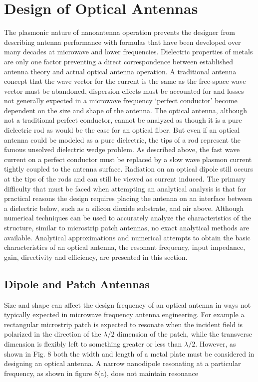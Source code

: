 \documentclass[11pt]{article}
\begin{document}
\section{Design of Optical Antennas}
%
The plasmonic nature of nanoantenna operation prevents the designer from describing antenna performance with formulas that have been developed over many decades at microwave and lower frequencies. Dielectric properties of metals are only one factor preventing a direct correspondence between established antenna theory and actual optical antenna operation. A traditional antenna concept that the wave vector for the current is the same as the free-space wave vector must be abandoned, dispersion effects must be accounted for and losses not generally expected in a microwave frequency  `perfect conductor' become dependent on the size and shape of the antenna.
The optical antenna, although not a traditional perfect conductor, cannot be analyzed as though it is a pure dielectric rod as would be the case for an optical fiber. But even if an optical antenna could be modeled as a pure dielectric, the tips of a rod represent the famous unsolved dielectric wedge problem. As described above, the fast wave current on a perfect conductor must be replaced by a slow wave plasmon current tightly coupled to the antenna surface. Radiation on an optical dipole still occurs at the tips of the rods and can still be viewed as current induced. The primary difficulty that must be faced when attempting an analytical analysis is that for practical reasons the design requires placing the antenna on an interface between a dielectric below, such as a silicon dioxide substrate, and air above. Although numerical techniques can be used to accurately analyze the characteristics of the structure, similar to microstrip patch antennas, no exact analytical methods are available. Analytical approximations and numerical attempts to obtain the basic characteristics of an optical antenna, the resonant frequency, input impedance, gain, directivity and efficiency, are presented in this section.
\subsection{Dipole and Patch Antennas}

Size and shape can affect the design frequency of an optical antenna in ways not typically expected in microwave frequency antenna engineering. For example a rectangular microstrip patch is expected to resonate when the incident field is polarized in the direction of the $\lambda/2$ dimension of the patch, while the transverse dimension is flexibly left to something greater or less than $\lambda/2$. However, as shown in Fig. 8 both the width and length of a metal plate must be considered in designing an optical antenna. A narrow nanodipole resonating at a particular frequency, as shown in figure 8(a), does not maintain resonance
\end{document}
